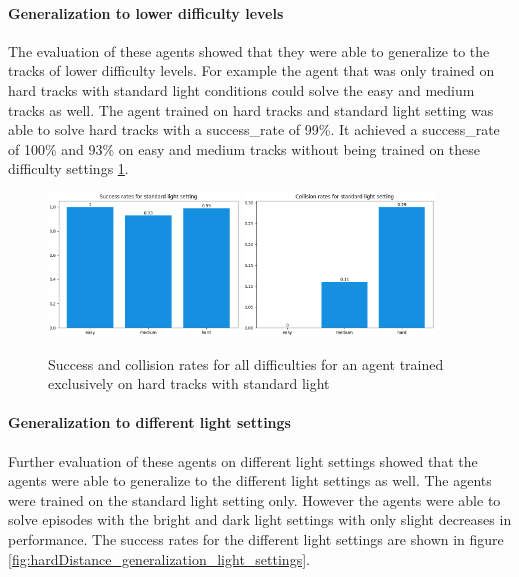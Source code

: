 \paragraph{Generalization to lower difficulty levels} 
The evaluation of these agents showed that they were able to generalize to the tracks of lower difficulty levels. For example the agent that was only trained on hard tracks with standard light conditions could solve the easy and medium tracks as well. The agent trained on hard tracks and standard light setting was able to solve hard tracks with a success\_rate of 99\%. It achieved a success\_rate of 100\% and 93\% on easy and medium tracks without being trained on these difficulty settings \ref{fig:hardDistance_generalization}.

\begin{figure}
    \centering
    \includegraphics[width=0.45\textwidth]{Bilder/notebook_images/hardDistanceStandardLight_eval_standard_success_rates_barplot.png}
    \includegraphics[width=0.45\textwidth]{Bilder/notebook_images/hardDistanceStandardLight_eval_standard_collision_rates_barplot.png}
    \caption{Success and collision rates for all difficulties for an agent trained exclusively on hard tracks with standard light}
    \label{fig:hardDistance_generalization}
\end{figure}

\paragraph{Generalization to different light settings}
\label{cha:experiment_fixed_difficulty_light_settings}
Further evaluation of these agents on different light settings showed that the agents were able to generalize to the different light settings as well. The agents were trained on the standard light setting only. However the agents were able to solve episodes with the bright and dark light settings with only slight decreases in performance. The success rates for the different light settings are shown in figure \ref{fig:hardDistance_generalization_light_settings}.

